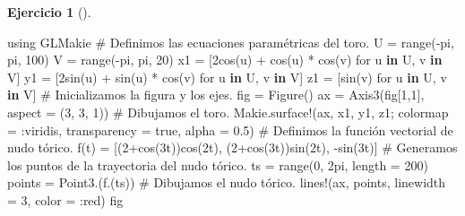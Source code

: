 \documentclass[
  a4paper,
]{scrreport}
\newenvironment{Shaded}{\begin{snugshade}}{\end{snugshade}}
\newcommand{\BuiltInTok}[1]{\textcolor[rgb]{0.00,0.23,0.31}{#1}}
\newcommand{\CommentTok}[1]{\textcolor[rgb]{0.37,0.37,0.37}{#1}}
\newcommand{\ConstantTok}[1]{\textcolor[rgb]{0.56,0.35,0.01}{#1}}
\newcommand{\FloatTok}[1]{\textcolor[rgb]{0.68,0.00,0.00}{#1}}
\newcommand{\FunctionTok}[1]{\textcolor[rgb]{0.28,0.35,0.67}{#1}}
\newcommand{\ImportTok}[1]{\textcolor[rgb]{0.00,0.46,0.62}{#1}}
\newcommand{\KeywordTok}[1]{\textcolor[rgb]{0.00,0.23,0.31}{\textbf{#1}}}
\newcommand{\NormalTok}[1]{\textcolor[rgb]{0.00,0.23,0.31}{#1}}
\newcommand{\OperatorTok}[1]{\textcolor[rgb]{0.37,0.37,0.37}{#1}}
\theoremstyle{definition}
\newtheorem{exercise}{Ejercicio}[chapter]
\theoremstyle{remark}
\begin{document}
\begin{exercise}[]
\begin{enumerate}
\begin{tcolorbox}
\begin{Shaded}
\begin{Highlighting}[]
\ImportTok{using} \BuiltInTok{GLMakie}
\CommentTok{\# Definimos las ecuaciones paramétricas del toro.}
\NormalTok{U }\OperatorTok{=} \FunctionTok{range}\NormalTok{(}\OperatorTok{{-}}\ConstantTok{pi}\NormalTok{, }\ConstantTok{pi}\NormalTok{, }\FloatTok{100}\NormalTok{)}
\NormalTok{V }\OperatorTok{=} \FunctionTok{range}\NormalTok{(}\OperatorTok{{-}}\ConstantTok{pi}\NormalTok{, }\ConstantTok{pi}\NormalTok{, }\FloatTok{20}\NormalTok{)}
\NormalTok{x1 }\OperatorTok{=}\NormalTok{ [}\FloatTok{2}\FunctionTok{cos}\NormalTok{(u) }\OperatorTok{+} \FunctionTok{cos}\NormalTok{(u) }\OperatorTok{*} \FunctionTok{cos}\NormalTok{(v) for u }\KeywordTok{in}\NormalTok{ U, v }\KeywordTok{in}\NormalTok{ V]}
\NormalTok{y1 }\OperatorTok{=}\NormalTok{ [}\FloatTok{2}\FunctionTok{sin}\NormalTok{(u) }\OperatorTok{+} \FunctionTok{sin}\NormalTok{(u) }\OperatorTok{*} \FunctionTok{cos}\NormalTok{(v) for u }\KeywordTok{in}\NormalTok{ U, v }\KeywordTok{in}\NormalTok{ V]}
\NormalTok{z1 }\OperatorTok{=}\NormalTok{ [}\FunctionTok{sin}\NormalTok{(v) for u }\KeywordTok{in}\NormalTok{ U, v }\KeywordTok{in}\NormalTok{ V]}
\CommentTok{\# Inicializamos la figura y los ejes.}
\NormalTok{fig }\OperatorTok{=} \FunctionTok{Figure}\NormalTok{()}
\NormalTok{ax }\OperatorTok{=} \FunctionTok{Axis3}\NormalTok{(fig[}\FloatTok{1}\NormalTok{,}\FloatTok{1}\NormalTok{], aspect }\OperatorTok{=}\NormalTok{ (}\FloatTok{3}\NormalTok{, }\FloatTok{3}\NormalTok{, }\FloatTok{1}\NormalTok{))}
\CommentTok{\# Dibujamos el toro.}
\NormalTok{Makie.}\FunctionTok{surface!}\NormalTok{(ax, x1, y1, z1; colormap }\OperatorTok{=} \OperatorTok{:}\NormalTok{viridis, transparency }\OperatorTok{=} \ConstantTok{true}\NormalTok{, alpha }\OperatorTok{=} \FloatTok{0.5}\NormalTok{)}
\CommentTok{\# Definimos la función vectorial de nudo tórico.}
\FunctionTok{f}\NormalTok{(t) }\OperatorTok{=}\NormalTok{ [(}\FloatTok{2}\FunctionTok{+cos}\NormalTok{(}\FloatTok{3}\NormalTok{t))}\FunctionTok{cos}\NormalTok{(}\FloatTok{2}\NormalTok{t), (}\FloatTok{2}\FunctionTok{+cos}\NormalTok{(}\FloatTok{3}\NormalTok{t))}\FunctionTok{sin}\NormalTok{(}\FloatTok{2}\NormalTok{t), }\FunctionTok{{-}sin}\NormalTok{(}\FloatTok{3}\NormalTok{t)] }
\CommentTok{\# Generamos los puntos de la trayectoria del nudo tórico.}
\NormalTok{ts }\OperatorTok{=} \FunctionTok{range}\NormalTok{(}\FloatTok{0}\NormalTok{, }\FloatTok{2}\NormalTok{pi, length }\OperatorTok{=} \FloatTok{200}\NormalTok{)}
\NormalTok{points }\OperatorTok{=} \FunctionTok{Point3}\NormalTok{.(}\FunctionTok{f}\NormalTok{.(ts))}
\CommentTok{\# Dibujamos el nudo tórico.}
\FunctionTok{lines!}\NormalTok{(ax, points, linewidth }\OperatorTok{=} \FloatTok{3}\NormalTok{, color }\OperatorTok{=} \OperatorTok{:}\NormalTok{red)}
\NormalTok{fig}
\end{Highlighting}
\end{Shaded}


\end{tcolorbox}
\end{enumerate}
\end{exercise}
\end{document}
